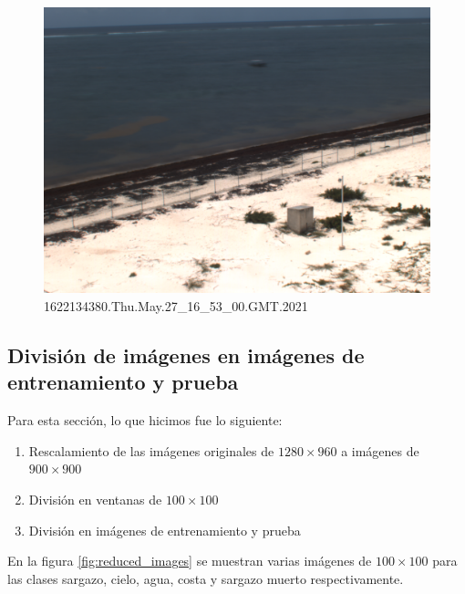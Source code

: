 \documentclass[conference]{IEEEtran}
\begin{document}
\begin{figure}[H]
    \centering
    \includegraphics[scale=0.13]{imgs/selected_img_1.png}
    \caption{1622134380.Thu.May.27\_16\_53\_00.GMT.2021}
\end{figure}


\subsection{División de imágenes en imágenes de entrenamiento y prueba}
Para esta sección, lo que hicimos fue lo siguiente:
\begin{enumerate}
    \item Rescalamiento de las imágenes originales de $1280\times 960$ a imágenes de $900\times900$
    \item División en ventanas de $100\times 100$
    \item División en imágenes de entrenamiento y prueba
\end{enumerate}

En la figura \ref{fig:reduced_images} se muestran varias imágenes de $100\times 100$ para las clases sargazo, cielo, agua, costa y sargazo muerto respectivamente. 
\end{document}
